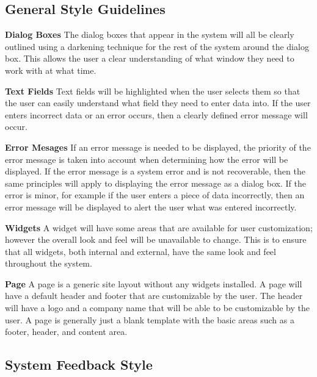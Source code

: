 \documentclass[letterpaper,12pt]{report}
\begin{document}
\subsection{General Style Guidelines}
\begin{description}
 \item \textbf{Dialog Boxes} \newline The dialog boxes that appear in the system will all be clearly outlined using a darkening technique for the rest of the system around the dialog box. This allows the user a clear understanding of what window they need to work with at what time. 
 \item \textbf{Text Fields} \newline Text fields will be highlighted when the user selects them so that the user can easily understand what field they need to enter data into. If the user enters incorrect data or an error occurs, then a clearly defined error message will occur.
 \item \textbf{Error Mesages} \newline If an error message is needed to be displayed, the priority of the error message is taken into account when determining how the error will be displayed. If the error message is a system error and is not recoverable, then the same principles will apply to displaying the error message as a dialog box. If the error is minor, for example if the user enters a piece of data incorrectly, then an error message will be displayed to alert the user what was entered incorrectly. 
 \item \textbf{Widgets} \newline A widget will have some areas that are available for user customization; however the overall look and feel will be unavailable to change. This is to ensure that all widgets, both internal and external, have the same look and feel throughout the system.
 \item \textbf{Page} \newline A page is a generic site layout without any widgets installed. A page will have a default header and footer that are customizable by the user. The header will have a logo and a company name that will be able to be customizable by the user. A page is generally just a blank template with the basic areas such as a footer, header, and content area.
 \end{description}


\subsection{System Feedback Style}
\end{document}
